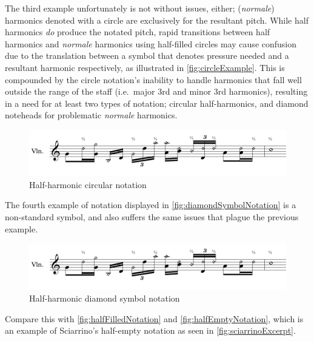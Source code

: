 The third example unfortunately is not without issues, either; (\emph{normale}) harmonics denoted with a circle are exclusively for the resultant pitch.\autocite[419]{gouldBars2011} 
While half harmonics \emph{do} produce the notated pitch, rapid transitions between half harmonics and \emph{normale} harmonics using half-filled circles may cause confusion due to the translation between a symbol that denotes pressure needed and a resultant harmonic respectively, as illustrated in \autoref{fig:circleExample}.
This is compounded by the circle notation's inability to handle harmonics that fall well outside the range of the staff (i.e.\ major 3rd and minor 3rd harmonics), resulting in a need for at least two types of notation; circular half-harmonics, and diamond noteheads for problematic \emph{normale} harmonics.

\begin{figure}
    \includegraphics[page=3,width=\textwidth]{resources/halfharmonicsSingleExamples.pdf}
    \caption{Half-harmonic circular notation}\label{fig:circleExample}
  \end{figure}

The fourth example of notation displayed in \autoref{fig:diamondSymbolNotation} is a non-standard symbol, and also suffers the same issues that plague the previous example.

\begin{figure}
  \includegraphics[page=4,width=\textwidth]{resources/halfharmonicsSingleExamples.pdf}
  \caption{Half-harmonic diamond symbol notation}\label{fig:diamondSymbolNotation}
\end{figure}


Compare this with \autoref{fig:halfFilledNotation} and \autoref{fig:halfEmptyNotation}, which is an example of Sciarrino's half-empty notation as seen in \autoref{fig:sciarrinoExcerpt}.


